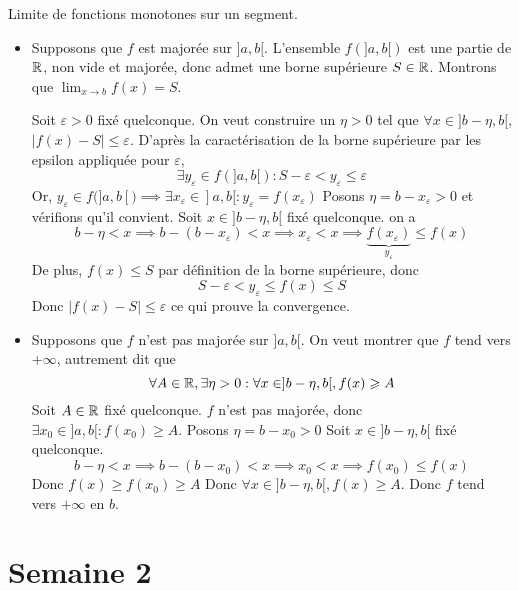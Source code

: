 \documentclass{article}
\renewenvironment{question_kholle}[2][ ]
{
	\subsection{\texorpdfstring{#2}{}}
	\notblank{#1}
	{
		\noindent #1
		\bigbreak
	}
	{}
	\begin{proof}
}
{
	\end{proof}
}
\begin{document}
{Limite de fonctions monotones sur un segment.}
	\begin{itemize}[label=$\star$]
		\item Supposons que $f$ est majorée sur $]a, b[$. L'ensemble $f(]a, b[)$ est une partie de $\mathbb R$, non vide et majorée, donc admet une borne supérieure $S \in \mathbb R$.
						      Montrons que $\lim_{ x \to b }f(x) = S$.

						      Soit $\varepsilon>0$ fixé quelconque. On veut construire un $\eta>0$ tel que $\forall x \in ]b-\eta, b[$, $\lvert f(x) - S \rvert \leqslant \varepsilon$.
						      D'après la caractérisation de la borne supérieure par les epsilon appliquée pour $\varepsilon$, $$\exists y_{\varepsilon} \in f(]a, b[) : S - \varepsilon < y_{\varepsilon} \leqslant \varepsilon$$
					      Or, $y_{\varepsilon} \in f(]a, b[) \implies \exists x_{\varepsilon}\in ]a, b[ : y_{\varepsilon} = f(x_{\varepsilon})$
						      Posons $\eta = b - x_{\varepsilon} > 0$ et vérifions qu'il convient.
						      Soit $x \in ]b - \eta, b[$ fixé quelconque.
		      on a $$
			      b-\eta < x \implies b- (b - x_{\varepsilon})< x \implies x_{\varepsilon} < x \implies \underbrace{ f(x_{\varepsilon}) }_{ y_{\varepsilon} } \leqslant f(x)
		      $$
		      De plus, $f(x) \leqslant S$ par définition de la borne supérieure, donc
		      $$
			      S - \varepsilon < y_{\varepsilon} \leqslant f(x) \leqslant S
		      $$
		      Donc $\lvert f(x) - S \rvert \leqslant \varepsilon$ ce qui prouve la convergence.

		\item Supposons que $f$ n'est pas majorée sur $]a, b[$.
						      On veut montrer que $f$ tend vers $+\infty$, autrement dit que
					      $$
					      \forall A \in \mathbb R, \exists \eta >0 : \forall x \in ]b- \eta , b[, f(x)\geqslant A
					      $$
					      Soit $A \in \mathbb R$ fixé quelconque.
					      $f$ n'est pas majorée, donc $\exists x_{0} \in ]a, b[ : f(x_{0}) \geqslant A$.
						      Posons $\eta = b - x_{0} > 0$
						      Soit $x \in ]b-\eta, b[$ fixé quelconque.
		      $$
			      b-\eta< x \implies b-(b-x_{0})< x \implies x_{0}<x \implies f(x_{0}) \leqslant f(x)
		      $$
		      Donc $f(x) \geqslant f(x_{0})\geqslant A$
		      Donc $\forall x \in ]b-\eta, b[, f(x) \geqslant A$.
		      Donc $f$ tend vers $+\infty$ en $b$.
	\end{itemize}
\end{question_kholle}
\pagebreak\section{Semaine 2}
\end{document}
